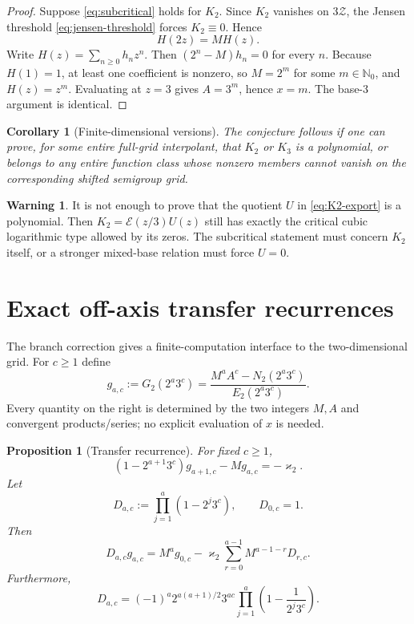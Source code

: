 \documentclass[11pt]{article}
\newtheorem{proposition}[theorem]{Proposition}
\newtheorem{corollary}[theorem]{Corollary}
\theoremstyle{definition}
\newtheorem{warning}[theorem]{Warning}
\newcommand{\Zgrid}{\mathscr{Z}}
\newcommand{\EE}{\mathcal{E}}
\newcommand{\kk}{\varkappa}
\newcommand{\N}{\mathbb{N}}
\begin{document}
\begin{proof}
Suppose \eqref{eq:subcritical} holds for $K_2$.  Since $K_2$ vanishes on $3\Zgrid$, the Jensen threshold \eqref{eq:jensen-threshold} forces $K_2\equiv0$.  Hence
\[
 H(2z)=MH(z).
\]
Write $H(z)=\sum_{n\ge0}h_nz^n$.  Then $(2^n-M)h_n=0$ for every $n$.  Because $H(1)=1$, at least one coefficient is nonzero, so $M=2^m$ for some $m\in\N_0$, and $H(z)=z^m$.  Evaluating at $z=3$ gives $A=3^m$, hence $x=m$.  The base-$3$ argument is identical.
\end{proof}

\begin{corollary}[Finite-dimensional versions]\label{cor:finite-dimensional}
The conjecture follows if one can prove, for some entire full-grid interpolant, that $K_2$
or $K_3$ is a polynomial, or belongs to any entire function class whose nonzero members
cannot vanish on the corresponding shifted semigroup grid.
\end{corollary}

\begin{warning}
It is not enough to prove that the quotient $U$ in \eqref{eq:K2-export} is a polynomial.  Then $K_2=\EE(z/3)U(z)$ still has exactly the critical cubic logarithmic type allowed by its zeros.  The subcritical statement must concern $K_2$ itself, or a stronger mixed-base relation must force $U=0$.
\end{warning}

\section{Exact off-axis transfer recurrences}

The branch correction gives a finite-computation interface to the two-dimensional grid.  For $c\ge1$ define
\begin{equation}\label{eq:gac}
 g_{a,c}:=G_2(2^a3^c)
 =\frac{M^aA^c-N_2(2^a3^c)}{E_2(2^a3^c)}.
\end{equation}
Every quantity on the right is determined by the two integers $M,A$ and convergent products/series; no explicit evaluation of $x$ is needed.

\begin{proposition}[Transfer recurrence]\label{prop:transfer}
For fixed $c\ge1$,
\begin{equation}\label{eq:transfer-recurrence}
 (1-2^{a+1}3^c)g_{a+1,c}-Mg_{a,c}=-\kk_2.
\end{equation}
Let
\[
 D_{a,c}:=\prod_{j=1}^{a}(1-2^j3^c),\qquad D_{0,c}=1.
\]
Then
\begin{equation}\label{eq:transfer-solution}
 D_{a,c}g_{a,c}
 =M^ag_{0,c}
 -\kk_2\sum_{r=0}^{a-1}M^{a-1-r}D_{r,c}.
\end{equation}
Furthermore,
\begin{equation}\label{eq:D-asymptotic}
 D_{a,c}=(-1)^a2^{a(a+1)/2}3^{ac}
 \prod_{j=1}^{a}\left(1-\frac1{2^j3^c}\right).
\end{equation}
\end{proposition}
\end{document}
